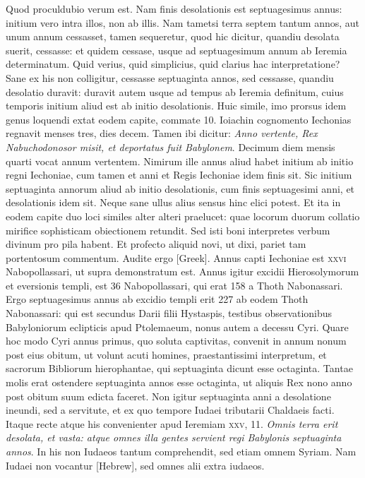 Quod
proculdubio verum est.
Nam finis desolationis est septuagesimus
annus: initium vero intra illos, non ab illis.
Nam tametsi terra septem
tantum annos, aut unum annum cessasset, tamen sequeretur,
quod hic dicitur, quandiu desolata suerit, cessasse: et quidem cessase,
usque ad septuagesimum annum ab Ieremia determinatum.
Quid verius, quid simplicius, quid clarius hac interpretatione?
Sane
ex his non colligitur, cessasse septuaginta annos, sed cessasse,
quandiu desolatio duravit: duravit autem usque ad tempus ab Ieremia
definitum, cuius temporis initium aliud est ab initio desolationis.
Huic simile, imo prorsus idem genus loquendi extat eodem capite,
commate 10.
Ioiachin cognomento Iechonias regnavit menses tres,
dies decem.
Tamen ibi dicitur: \textit{Anno vertente, Rex Nabuchodonosor
misit, et deportatus fuit Babylonem}.
Decimum diem mensis quarti
vocat annum vertentem.
Nimirum ille annus aliud habet initium
ab initio regni Iechoniae, cum tamen et anni et Regis Iechoniae
idem finis sit.
Sic initium septuaginta annorum aliud ab initio desolationis,
cum finis septuagesimi anni, et desolationis idem sit.
Neque sane ullus alius sensus hinc elici potest.
Et ita in eodem capite
duo loci similes alter alteri praelucet: quae locorum duorum
collatio mirifice sophisticam obiectionem retundit.
Sed isti boni
interpretes verbum divinum pro pila habent.
Et profecto aliquid
novi, ut dixi, pariet tam portentosum commentum.
Audite
ergo \textgreek{[Greek]}.
Annus capti Iechoniae est \textsc{xxvi} Nabopollassari,
ut supra demonstratum est.
Annus igitur excidii Hierosolymorum
et eversionis templi, est 36 Nabopollassari, qui erat 158 a
Thoth Nabonassari.
Ergo septuagesimus annus ab excidio templi
erit 227 ab eodem Thoth Nabonassari: qui est secundus Darii filii
Hystaspis, testibus observationibus Babyloniorum eclipticis apud
Ptolemaeum, nonus autem a decessu Cyri.
Quare hoc modo
Cyri annus primus, quo soluta captivitas, convenit in annum
nonum post eius obitum, ut volunt acuti homines, praestantissimi
interpretum, et sacrorum Bibliorum hierophantae, qui septuaginta
dicunt esse octaginta.
Tantae molis erat ostendere septuaginta
annos esse octaginta, ut aliquis Rex nono anno post obitum
suum edicta faceret.
Non igitur septuaginta anni a desolatione
ineundi, sed a servitute, et ex quo tempore Iudaei tributarii
Chaldaeis facti.
Itaque recte atque his convenienter apud Ieremiam
\textsc{xxv}, 11.
\textit{Omnis terra erit desolata, et vasta: atque omnes
illa gentes servient regi Babylonis septuaginta annos}.
In his non Iudaeos
tantum comprehendit, sed etiam omnem Syriam.
{}
Nam Iudaei
non vocantur \texthebrew{[Hebrew]}, sed omnes alii extra iudaeos.

